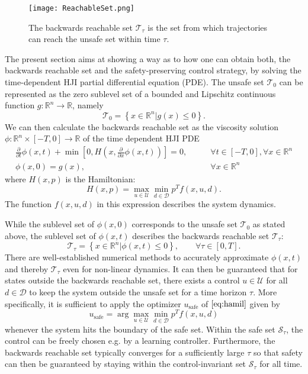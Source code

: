 \documentclass[../main.tex]{subfiles}
\begin{document}
\begin{figure}
    \centering
    \texttt{[image: ReachableSet.png]}
        \caption{The backwards reachable set $\mathcal{T}_\tau$ is the set from which trajectories can reach the unsafe set within time $\tau$.}    
    \label{fig:reachable}
\end{figure}
The present section aims at showing a way as to how one can obtain both, the backwards reachable set and the safety-preserving control strategy, by solving the time-dependent HJI partial differential equation (PDE). The unsafe set $\mathcal{T}_0$ can be represented as the zero sublevel set of a bounded and Lipschitz continuous function $g: \mathbb{R}^n \rightarrow \mathbb{R}$, namely
\begin{equation}
    \mathcal{T}_0 = \left\{ x \in \mathbb{R}^n | g(x) \leq 0 \right \}. 
\end{equation}
We can then calculate the backwards reachable set as the viscosity solution \linebreak \mbox{$\phi: \mathbb{R}^n \times [-T, 0] \rightarrow \mathbb{R}$} of the time dependent HJI PDE
\begin{align}
    \frac{\partial}{\partial t} \phi(x,t) + \min\left[0, H\left(x,\frac{\partial}{\partial x} \phi(x,t)\right)\right] = 0, \qquad &\forall t \in [-T, 0], \forall x \in \mathbb{R}^n\\
    \phi(x,0) = g(x), \qquad &\forall x \in \mathbb{R}^n
\end{align}
where $H(x,p)$ is the Hamiltonian: 
\begin{equation}\label{eq:hamil}
    H(x,p) = \max_{u \in \mathcal{U}} \min_{d \in \mathcal{D}} p^T f(x,u,d).
\end{equation}
The function $f(x,u,d)$ in this expression describes the system dynamics.

While the sublevel set of $\phi(x,0)$ corresponds to the unsafe set $\mathcal{T}_0$ as stated above, the sublevel set of $\phi(x,t)$ describes the backwards reachable set $\mathcal{T}_\tau$:
\begin{equation}
    \mathcal{T}_\tau = \left\{ x \in \mathbb{R}^n | \phi(x,t) \leq 0 \right \}, \qquad \forall \tau \in [0,T].
\end{equation}
There are well-established numerical methods to accurately approximate $\phi(x,t)$ and thereby $\mathcal{T}_\tau$ even for non-linear dynamics. It can then be guaranteed that for states outside the backwards reachable set, there exists a control $u \in \mathcal{U}$ for all $d \in \mathcal{D}$ to keep the system outside the unsafe set for a time horizon $\tau$. More specifically, it is sufficient to apply the optimizer $u_{\text{safe}}$ of $\eqref{eq:hamil}$ given by
\begin{equation}
    u_{\text{safe}} = \arg \max_{u \in \mathcal{U}} \min_{d \in \mathcal{D}} p^T f(x,u,d)
\end{equation}
whenever the system hits the boundary of the safe set. Within the safe set $\mathcal{S}_\tau$, the control can be freely chosen e.g. by a learning controller. 
Furthermore, the backwards reachable set typically converges for a sufficiently large $\tau$ so that safety can then be guaranteed by staying within the control-invariant set $\mathcal{S}_\tau$ for all time. 
\end{document}
